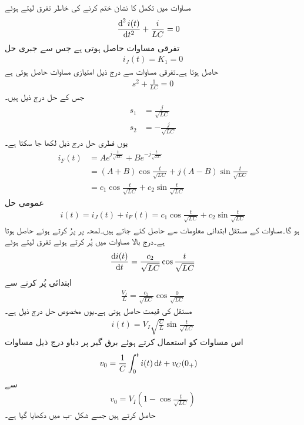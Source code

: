 مساوات  میں تکمل کا نشان ختم کرنے کی خاطر تفرق لیتے ہوئے
\begin{align*}
\frac{\dif^{\, 2} i(t)}{\dif t^2}+\frac{i}{LC}&=0
\end{align*}
تفرقی مساوات حاصل ہوتی ہے جس سے جبری حل
\begin{align*}
i_J(t)=K_1=0
\end{align*}
حاصل ہوتا ہے۔تفرقی مساوات سے درج ذیل امتیازی مساوات حاصل ہوتی ہے
\begin{align*}
s^2+\frac{1}{LC}=0
\end{align*}
جس کے حل درج ذیل ہیں۔
\begin{align*}
s_1&=\frac{j}{\sqrt{LC}}\\
s_2&=-\frac{j}{\sqrt{LC}}
\end{align*}
یوں فطری حل درج ذیل لکھا جا سکتا ہے۔
\begin{align*}
i_F(t)&=A e^{j\frac{t}{\sqrt{LC}}}+Be^{-j\frac{t}{\sqrt{LC}}}\\
&=(A+B) \cos \frac{t}{\sqrt{LC}}+j(A-B) \sin \frac{t}{\sqrt{LC}}\\
&=c_1\cos \frac{t}{\sqrt{LC}}+c_2\sin \frac{t}{\sqrt{LC}}
\end{align*}
عمومی حل
\begin{align*}
i(t)=i_J(t)+i_F(t)=c_1\cos \frac{t}{\sqrt{LC}}+c_2\sin \frac{t}{\sqrt{LC}}
\end{align*}
ہو گا۔مساوات کے مستقل ابتدائی معلومات سے حاصل کئے جاتے ہیں۔لمحہ  پر  پرُ کرتے ہوئے  حاصل ہوتا ہے۔درج بالا مساوات میں  پُر کرتے ہوئے تفرق لیتے ہوئے
\begin{align*}
\frac{\dif i(t)}{\dif t}=\frac{c_2}{\sqrt{LC}}\cos \frac{t}{\sqrt{LC}}
\end{align*}
ابتدائی  پُر کرنے سے
\begin{align*}
\frac{V_I}{L}=\frac{c_2}{\sqrt{LC}}\cos \frac{0}{\sqrt{LC}}
\end{align*}
مستقل کی قیمت  حاصل ہوتی ہے۔یوں مخصوص حل درج ذیل ہے۔
\begin{align}\label{مساوات_عارضی_امالہ_برق_گیر_رو}
i(t)=V_I\sqrt{\frac{C}{L}} \sin \frac{t}{\sqrt{LC}}
\end{align}
اس مساوات کو استعمال کرتے ہوئے برق گیر پر دباو   درج ذیل مساوات
\begin{align*}
v_0&=\frac{1}{C}\int_{0}^{t} i(t) \dif t+v_C(0_+)
\end{align*}
سے
\begin{align}\label{مساوات_عارضی_امالہ_برق_گیر_دگنا_دباو}
v_0=V_I\left(1-\cos \frac{t}{\sqrt{LC}} \right)
\end{align}
حاصل کرتے ہیں جسے شکل -ب میں دکھایا گیا ہے۔

